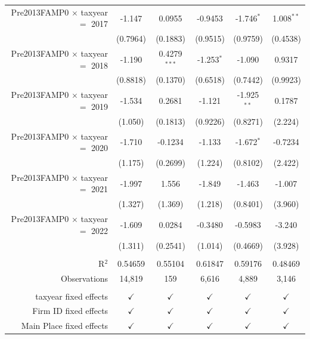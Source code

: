 {\begin{tabular}{rccccc}
   Pre2013FAMP0 $\times$ taxyear $=$ 2017  & -1.147        & 0.0955          & -0.9453       & -1.746$^{*}$   & 1.008$^{**}$\\   
                                           & (0.7964)      & (0.1883)        & (0.9515)      & (0.9759)       & (0.4538)\\   
   Pre2013FAMP0 $\times$ taxyear $=$ 2018  & -1.190        & 0.4279$^{***}$  & -1.253$^{*}$  & -1.090         & 0.9317\\   
                                           & (0.8818)      & (0.1370)        & (0.6518)      & (0.7442)       & (0.9923)\\   
   Pre2013FAMP0 $\times$ taxyear $=$ 2019  & -1.534        & 0.2681          & -1.121        & -1.925$^{**}$  & 0.1787\\   
                                           & (1.050)       & (0.1813)        & (0.9226)      & (0.8271)       & (2.224)\\   
   Pre2013FAMP0 $\times$ taxyear $=$ 2020  & -1.710        & -0.1234         & -1.133        & -1.672$^{*}$   & -0.7234\\   
                                           & (1.175)       & (0.2699)        & (1.224)       & (0.8102)       & (2.422)\\   
   Pre2013FAMP0 $\times$ taxyear $=$ 2021  & -1.997        & 1.556           & -1.849        & -1.463         & -1.007\\   
                                           & (1.327)       & (1.369)         & (1.218)       & (0.8401)       & (3.960)\\   
   Pre2013FAMP0 $\times$ taxyear $=$ 2022  & -1.609        & 0.0284          & -0.3480       & -0.5983        & -3.240\\   
                                           & (1.311)       & (0.2541)        & (1.014)       & (0.4669)       & (3.928)\\   
    \\
   R$^2$                                   & 0.54659       & 0.55104         & 0.61847       & 0.59176        & 0.48469\\  
   Observations                            & 14,819        & 159             & 6,616         & 4,889          & 3,146\\  
    \\
   taxyear fixed effects                   & $\checkmark$  & $\checkmark$    & $\checkmark$  & $\checkmark$   & $\checkmark$\\   
   Firm ID fixed effects                   & $\checkmark$  & $\checkmark$    & $\checkmark$  & $\checkmark$   & $\checkmark$\\   
   Main Place fixed effects                & $\checkmark$  & $\checkmark$    & $\checkmark$  & $\checkmark$   & $\checkmark$\\   
   \bottomrule
\end{tabular}
}
